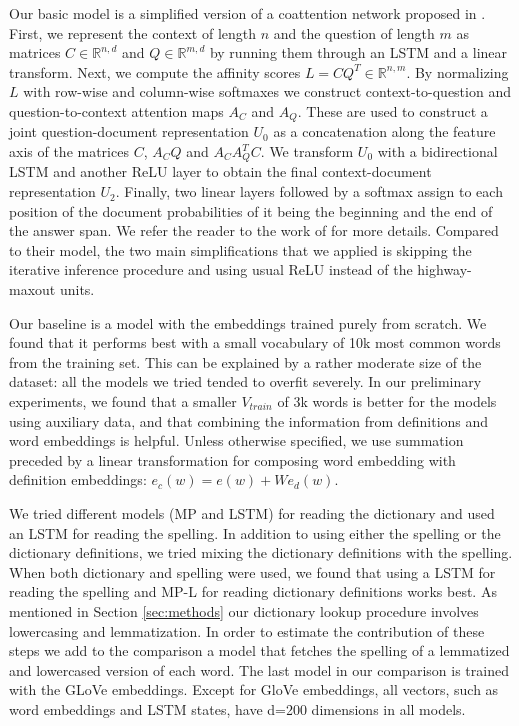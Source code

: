 Our basic model is a simplified version of a coattention network proposed in \citep{xiong2017dynamic}. First, we represent the context of length $n$ and the question of length $m$ as matrices $C\in\mathbb{R}^{n,d}$ and $Q \in\mathbb{R}^{m,d}$ by running them through an LSTM and a linear transform. Next, we compute the affinity scores $L=CQ^T \in \mathbb{R}^{n, m}$. By normalizing $L$ with row-wise and column-wise softmaxes we construct context-to-question and question-to-context attention maps $A_C$ and $A_Q$. These are used to construct a joint question-document representation $U_0$ as a concatenation along the feature axis of the matrices $C$, $A_CQ$ and $A_C A_Q^T C$. We transform $U_0$ with a bidirectional LSTM and another ReLU\citep{glorot2011deep} layer to obtain the final context-document representation $U_2$. Finally, two linear layers followed by a softmax assign to each position of the document probabilities of it being the beginning and the end of the answer span. We refer the reader to the work of \citet{xiong2017dynamic} for more details. Compared to their model, the two main simplifications that we applied is skipping the iterative inference procedure and using usual ReLU instead of the highway-maxout units.


Our baseline is a model with the embeddings trained purely from scratch. We found that it performs best with a small vocabulary of 10k most common words from the training set. This can be explained by a rather moderate size of the dataset: all the models we tried tended to overfit severely. In our preliminary experiments, we found that a smaller $V_{train}$ of 3k words is better for the models using auxiliary data, and that combining the information from definitions and word embeddings is helpful.
Unless otherwise specified, we use summation preceded by a linear transformation for composing word embedding with definition embeddings: $e_c(w) = e(w) + W e_d(w)$. 

We tried different models (MP and LSTM) for reading the dictionary and used an LSTM for reading the spelling.  In addition to using either the spelling or the dictionary definitions, we tried mixing the dictionary definitions with the spelling. When both dictionary and spelling were used, we found that using a LSTM for reading the spelling and MP-L for reading dictionary definitions works best. 
As mentioned in Section \ref{sec:methods} our dictionary lookup procedure involves lowercasing and lemmatization. In order to estimate the contribution of these steps we add to the comparison a model that fetches the spelling of a lemmatized and lowercased version of each word. The last model in our comparison is trained with the GLoVe embeddings. Except for GloVe embeddings, all vectors, such as word embeddings and LSTM states, have d=200 dimensions in all models.

